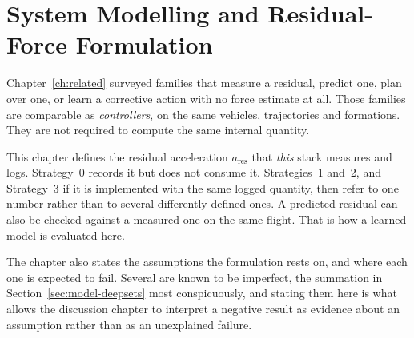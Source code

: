 %
%
%
%

\chapter{System Modelling and Residual-Force Formulation}
\label{ch:model}

Chapter~\ref{ch:related} surveyed families that measure a residual, predict one, plan over one, or
learn a corrective action with no force estimate at all. Those families are comparable as
\emph{controllers}, on the same vehicles, trajectories and formations. They are not required to
compute the same internal quantity.

This chapter defines the residual acceleration $a_{\mathrm{res}}$ that \emph{this} stack measures
and logs. Strategy~0 records it but does not consume it. Strategies~1 and~2, and Strategy~3 if it
is implemented with the same logged quantity, then refer to one number rather than to several
differently-defined ones. A predicted residual can also be checked against a measured one on the
same flight. That is how a learned model is evaluated here.

The chapter also states the assumptions the formulation rests on, and where each one is expected
to fail. Several are known to be imperfect, the summation in
Section~\ref{sec:model-deepsets} most conspicuously, and stating them here is what allows
the discussion chapter to interpret a negative result as evidence about an assumption
rather than as an unexplained failure.

